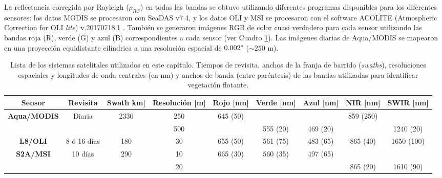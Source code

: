         La reflectancia corregida por Rayleigh ($\rho_{RC}$) en todas las bandas se obtuvo utilizando diferentes programas disponibles para los diferentes sensores: los datos MODIS se procesaron con SeaDAS v7.4, y los datos OLI y MSI se procesaron con el software ACOLITE (Atmospheric Correction for OLI \textit{lite}) v.20170718.1 \cite{vanhellemont2014}\cite{vanhellemont2015}. También se generaron imágenes RGB de color cuasi verdadero para cada sensor utilizando las bandas roja (R), verde (G) y azul (B) correspondientes a cada sensor (ver Cuadro \ref{cam:tab:sistemas}). Las imágenes diarias de Aqua/MODIS se mapearon en una proyección equidistante cilíndrica a una resolución espacial de $0.002\degree$ ($\sim 250$ m).


        \begin{table}
        \tiny
        \setlength\tabcolsep{1.5pt} %
        \caption[Lista de los sistemas satelitales utilizados para la detección de vegetación flotante.]{Lista de los sistemas satelitales utilizados en este capítulo. Tiempos de revisita, anchos de la franja de barrido (\textit{swaths}), resoluciones espaciales y longitudes de onda centrales (en nm) y anchos de banda (entre paréntesis) de las bandas utilizadas para identificar vegetación flotante.}
        \begin{tabular}{|c|c|c|c|c|c|c|c|c|}
        \hline
        \textbf{Sensor} & \textbf{Revisita} & \textbf{Swath km]}      & \textbf{Resolución [m]} & \textbf{Rojo [nm]} & \textbf{Verde [nm]} & \textbf{Azul [nm]} & \textbf{NIR [nm]} & \textbf{SWIR [nm]} \\ \hline
        \multirow{2}{*}{\textbf{Aqua/MODIS}} & \multirow{2}{*}{Diaria}   & \multirow{2}{*}{2330} & 250     & 645 (50)  &     &    & 859 (250) &    \\ \cline{4-9} 
             &          &       & 500     &   & 555 (20)    & 469 (20)   &   & 1240 (20)  \\ \hline
        \textbf{L8/OLI}      & 8 ó 16 días     & 180   & 30      & 655 (50)  & 561 (75)    & 483 (65)   & 865 (40)  & 1650 (100) \\ \hline
        \multirow{2}{*}{\textbf{S2A/MSI}}    & \multirow{2}{*}{10 días} & \multirow{2}{*}{290}  & 10      & 665 (30)  & 560 (35)    & 497 (65)   &   &    \\ \cline{4-9} 
             &          &       & 20      &   &     &    & 865 (20)  & 1610 (90)  \\ \hline
        \end{tabular}
        \label{cam:tab:sistemas}
        \end{table}


